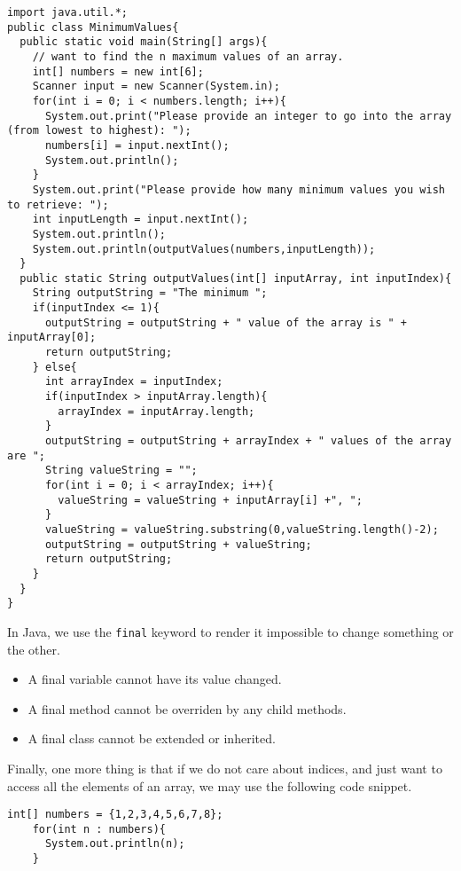 \documentclass[10pt]{mypackage}
\begin{document}
  \begin{lstlisting}[style=javastyle,title=Finding the Minimum $n$ Values in an Array]
import java.util.*;
public class MinimumValues{
  public static void main(String[] args){
    // want to find the n maximum values of an array.
    int[] numbers = new int[6];
    Scanner input = new Scanner(System.in);
    for(int i = 0; i < numbers.length; i++){
      System.out.print("Please provide an integer to go into the array (from lowest to highest): ");
      numbers[i] = input.nextInt();
      System.out.println();
    }
    System.out.print("Please provide how many minimum values you wish to retrieve: ");
    int inputLength = input.nextInt();
    System.out.println();
    System.out.println(outputValues(numbers,inputLength));
  }
  public static String outputValues(int[] inputArray, int inputIndex){
    String outputString = "The minimum ";
    if(inputIndex <= 1){
      outputString = outputString + " value of the array is " + inputArray[0];
      return outputString;
    } else{
      int arrayIndex = inputIndex;
      if(inputIndex > inputArray.length){
        arrayIndex = inputArray.length;
      }
      outputString = outputString + arrayIndex + " values of the array are ";
      String valueString = "";
      for(int i = 0; i < arrayIndex; i++){
        valueString = valueString + inputArray[i] +", ";
      }
      valueString = valueString.substring(0,valueString.length()-2);
      outputString = outputString + valueString;
      return outputString;
    }
  }
}
  \end{lstlisting}
  In Java, we use the \texttt{final} keyword to render it impossible to change something or the other.
  \begin{itemize}
    \item A final variable cannot have its value changed.
    \item A final method cannot be overriden by any child methods.
    \item A final class cannot be extended or inherited.
  \end{itemize}
  Finally, one more thing is that if we do not care about indices, and just want to access all the elements of an array, we may use the following code snippet.
  \begin{lstlisting}[style=javastyle,title=Accessing Array]
    int[] numbers = {1,2,3,4,5,6,7,8};
    for(int n : numbers){
      System.out.println(n);
    }
  \end{lstlisting}
  
\end{document}
